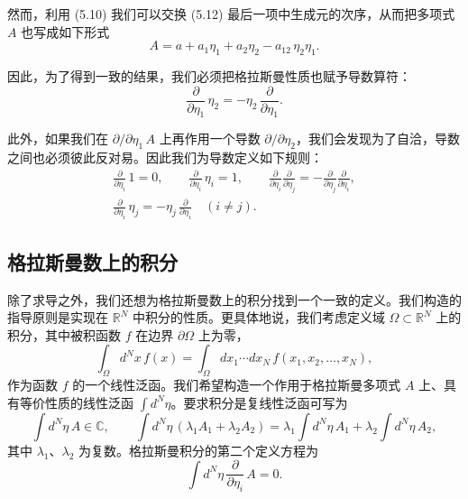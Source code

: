 然而，利用 (5.10) 我们可以交换 (5.12) 最后一项中生成元的次序，从而把多项式 $A$ 也写成如下形式
\begin{equation}
  A = a + a_1\eta_1 + a_2\eta_2 - a_{12}\,\eta_2\eta_1 .
\end{equation}

因此，为了得到一致的结果，我们必须把格拉斯曼性质也赋予导数算符：
\begin{equation}
  \frac{\partial}{\partial\eta_1}\,\eta_2 = -\eta_2\,\frac{\partial}{\partial\eta_1} .
\end{equation}

此外，如果我们在 $\partial/\partial\eta_1\,A$ 上再作用一个导数 $\partial/\partial\eta_2$，我们会发现为了自洽，导数之间也必须彼此反对易。因此我们为导数定义如下规则：
\begin{equation}
  \begin{aligned}
    \frac{\partial}{\partial\eta_i}\,1 = 0, \qquad
    \frac{\partial}{\partial\eta_i}\,\eta_i = 1, \qquad
    \frac{\partial}{\partial\eta_i}\frac{\partial}{\partial\eta_j}
      = -\frac{\partial}{\partial\eta_j}\frac{\partial}{\partial\eta_i}, \\
    \frac{\partial}{\partial\eta_i}\,\eta_j = -\eta_j\,\frac{\partial}{\partial\eta_i}
    \quad (i \neq j) .
  \end{aligned}
\end{equation}

\subsection{格拉斯曼数上的积分}

除了求导之外，我们还想为格拉斯曼数上的积分找到一个一致的定义。我们构造的指导原则是实现在 $\mathbb{R}^N$ 中积分的性质。更具体地说，我们考虑定义域 $\Omega \subset \mathbb{R}^N$ 上的积分，其中被积函数 $f$ 在边界 $\partial\Omega$ 上为零，
\begin{equation}
  \int_{\Omega}d^Nx\,f(x) =
  \int_{\Omega}dx_1\cdots dx_N\,f(x_1, x_2, \ldots, x_N) ,
\end{equation}
作为函数 $f$ 的一个线性泛函。我们希望构造一个作用于格拉斯曼多项式 $A$ 上、具有等价性质的线性泛函 $\int d^N\eta$。要求积分是复线性泛函可写为
\begin{equation}
  \int d^N\eta\,A \in \mathbb{C}, \qquad
  \int d^N\eta\,(\lambda_1 A_1 + \lambda_2 A_2)
  = \lambda_1\int d^N\eta\,A_1 + \lambda_2\int d^N\eta\,A_2 ,
\end{equation}
其中 $\lambda_1$、$\lambda_2$ 为复数。格拉斯曼积分的第二个定义方程为
\begin{equation}
  \int d^N\eta\,\frac{\partial}{\partial\eta_i}\,A = 0 .
\end{equation}

